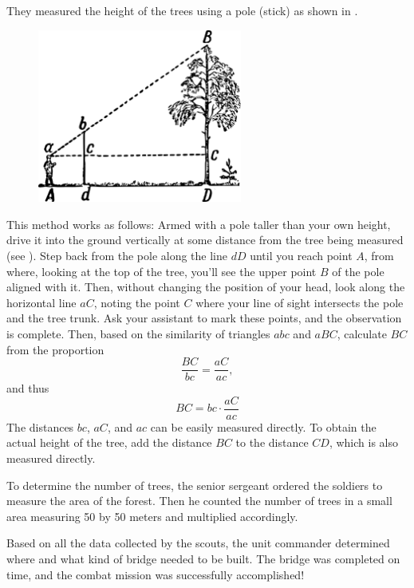 They measured the height of the trees using a pole (stick) as shown in .

\begin{figure}[h!]
\centering
\includegraphics[width=0.6\textwidth]{figures/ch-01/fig-01-08.pdf}
\end{figure}

This method works as follows: Armed with a pole taller than your own height, drive it into the ground vertically at some distance from the tree being measured (see ). Step back from the pole along the line $dD$ until you reach point $A$, from where, looking at the top of the tree, you'll see the upper point $B$ of the pole aligned with it. Then, without changing the position of your head, look along the horizontal line $aC$, noting the point $C$ where your line of sight intersects the pole and the tree trunk. Ask your assistant to mark these points, and the observation is complete. Then, based on the similarity of triangles $abc$ and $aBC$, calculate $BC$ from the proportion 
\begin{equation*}%
\frac{BC}{bc} = \frac{aC}{ac},
\end{equation*}
and thus
\begin{equation*}%
BC = bc \cdot \frac{aC}{ac}
\end{equation*}
The distances $bc$, $aC$, and $ac$ can be easily measured directly. To obtain the actual height of the tree, add the distance $BC$ to the distance $CD$, which is also measured directly.

To determine the number of trees, the senior sergeant ordered the soldiers to measure the area of the forest. Then he counted the number of trees in a small area measuring 50 by 50 meters and multiplied accordingly.

Based on all the data collected by the scouts, the unit commander determined where and what kind of bridge needed to be built. The bridge was completed on time, and the combat mission was successfully accomplished!

